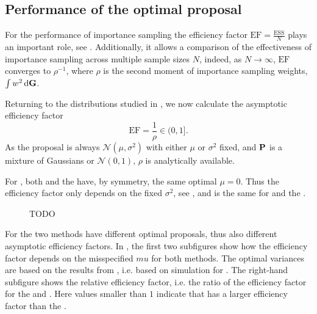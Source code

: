 \subsection{Performance of the optimal proposal}
\label{subsec:performance_at_optimal}
For the performance of importance sampling the efficiency factor $ \text{EF} = \frac{\text{ESS}}{N}$ plays an important role, see . Additionally, it allows a comparison of the effectiveness of importance sampling across multiple sample sizes $N$, indeed, as $N\to\infty$, $\text{EF}$ converges to $ \rho^{-1}$, where $\rho$ is the second moment of importance sampling weights, $\int w^{2} \d \G$.

Returning to the distributions studied in , we now calculate the asymptotic efficiency factor
$$
\text{EF} = \frac{1}{\rho} \in (0, 1].
$$
As the proposal is always $\mathcal N(\mu, \sigma^{2})$ with either $\mu$ or $\sigma^{2}$ fixed, and $\P$ is a mixture of Gaussians or $\mathcal N(0,1)$, $\rho$ is analytically available. 

For , both \aeis and the \acem have, by symmetry, the same optimal $\mu = 0$. Thus the efficiency factor only depends on the fixed $\sigma^{2}$, see , and is the same for \aeis and the \acem.

\begin{figure}
    \centering
    \resizebox{\textwidth}{!}{%
    }
    \caption{{\color{red}} TODO}
    \label{fig:rho_mu}

\end{figure}

For  the two methods have different optimal proposals, thus also different asymptotic efficiency factors. In , the first two subfigures show how the efficiency factor depends on the misspecified $mu$ for both methods. The optimal variances are based on the results from , i.e. based on simulation for \aeis. The right-hand subfigure shows the relative efficiency factor, i.e. the ratio of the efficiency factor for the \acem and \aeis. Here values smaller than $1$ indicate that \aeis has a larger efficiency factor than the \acem. 

